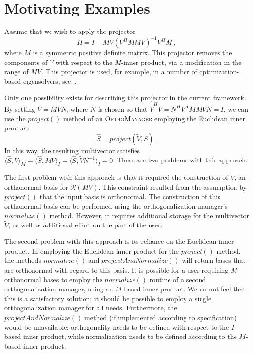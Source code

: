 \documentclass[12pt,letterpaper]{SANDreport}
\theoremstyle{example}
\newcommand{\inner}[2]{\langle #1,#2 \rangle}
\newcommand{\range}[1]{\mathcal{R}(#1)}
\begin{document}
\section{Motivating Examples}
\label{sec:example}

Assume that we wish to apply the projector
\begin{equation}
\Pi = I - M V (V^H M M V)^{-1} V^H M\ ,
\label{eq:piexample}
\end{equation}
where $M$ is a symmetric positive definite matrix. This projector removes the components
of $V$ with respect to the $M$-inner product, via a modification in the range of $MV$.
This projector is used, for example, in a number of optimization-based eigensolvers;
see~\cite{SW82,ST2000,ABG2006-JCAM}.

Only one possibility exists for describing this projector in the current framework. By
setting $\tilde{V} \doteq M V N$, where $N$ is chosen so that $\tilde{V}^H \tilde{V} = N^H
V^H M M V N = I$, we can use the $project()$ method of an \textsc{OrthoManager} employing
the Euclidean inner product:
\[
\hat{S} = project(\tilde{V},S)\ . 
\]
In this way, the resulting multivector satisfies $\inner{\hat{S}}{V}_M = \inner{\hat{S}}{MV}_I =
\inner{\hat{S}}{\tilde{V}N^{-1}}_I = 0$. There are two problems with this approach.

The first problem with this approach is that it required the construction of $\tilde{V}$,
an orthonormal basis for $\range{MV}$. This constraint resulted from the assumption by
$project()$ that the input basis is orthonormal. The construction of this orthonormal
basis can be performed using the orthogonalization manager's $normalize()$ method.
However, it requires additional storage for the multivector $\tilde{V}$, as well as
additional effort on the part of the user.

The second problem with this approach is its reliance on the Euclidean inner product. In
employing the Euclidean inner product for the $project()$ method, the methods
$normalize()$ and $projectAndNormalize()$ will return bases that are orthonormal with
regard to this basis. It is possible for a user requiring $M$-orthonormal bases to employ
the $normalize()$ routine of a second orthogonalization manager, using an $M$-based inner
product. We do not feel that this is a satisfactory solution; it should be possible to
employ a single orthogonalization manager for all needs. Furthermore, the
$projectAndNormalize()$ method (if implemented according to specification) would be
unavailable: orthogonality needs to be defined with respect to the $I$-based inner
product, while normalization needs to be defined according to the $M$-based inner product.
\end{document}
